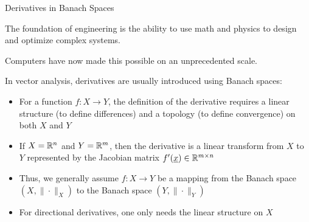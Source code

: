 \documentclass[10pt,letterpaper,english]{beamer}
\begin{document}
\begin{frame}{Derivatives in Banach Spaces}

The foundation of engineering is the ability to use math and physics to design and optimize complex systems.

\vspace{3mm}

Computers have now made this possible on an unprecedented scale.

\vspace{3mm}

In vector analysis, derivatives are usually introduced using Banach spaces: \vspace{-2mm}
\begin{itemize}
\item<1-> For a function $f \colon X \rightarrow Y$, the definition of the derivative requires a linear structure (to define differences) and a topology (to define convergence) on both $X$ and $Y$ \vspace{1mm}

\item<2-> If $X=\mathbb{R}^n$ and $Y=\mathbb{R}^m$, then the derivative is a linear transform from $X$ to $Y$ represented by the Jacobian matrix $f'(\underline{x}) \in \mathbb{R}^{m\times n}$ \vspace{1mm}

\item<3-> Thus, we generally assume $f \colon X \rightarrow Y$ be a mapping from the Banach space $(X,\|\cdot\|_X)$ to the Banach space $(Y,\|\cdot\|_Y)$ \vspace{1mm}

\item<4-> For directional derivatives, one only needs the linear structure on $X$
\end{itemize}
\end{frame}
\end{document}
